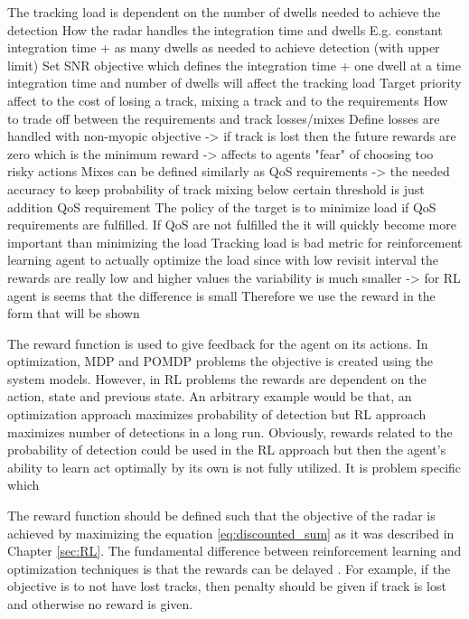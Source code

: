 \documentclass[english, 12pt, a4paper, elec, utf8, a-1b, online]{aaltothesis}
\begin{document}
\begin{outline}[itemize]
    \1 The tracking load is dependent on the number of dwells needed to achieve the detection
        \2 How the radar handles the integration time and dwells
            \3 E.g. constant integration time + as many dwells as needed to achieve detection (with upper limit)
            \3 Set SNR objective which defines the integration time + one dwell at a time
        \2 integration time and number of dwells will affect the tracking load
    \1 Target priority affect to the cost of losing a track, mixing a track and to the requirements
        \2 How to trade off between the requirements and track losses/mixes
            \3 Define losses are handled with non-myopic objective -> if track is lost then the future rewards are zero which is the minimum reward -> affects to agents "fear" of choosing too risky actions
            \3 Mixes can be defined similarly as QoS requirements -> the needed accuracy to keep probability of track mixing below certain threshold  is just addition QoS requirement
        \2 The policy of the target is to minimize load if QoS requirements are fulfilled. If QoS are not fulfilled the it will quickly become more important than minimizing the load
    \1 Tracking load is bad metric for reinforcement learning agent to actually optimize the load since with low revisit interval the rewards are really low and higher values the variability is much smaller -> for RL agent is seems that the difference is small
        \2 Therefore we use the reward in the form that will be shown 
\end{outline}

The reward function is used to give feedback for the agent on its actions.
In optimization, MDP and POMDP problems the objective is created using the system models.
However, in RL problems the rewards are dependent on the action, state and previous state. 
An arbitrary example would be that, an optimization approach maximizes probability of detection but RL approach maximizes number of detections in a long run.
Obviously, rewards related to the probability of detection could be used in the RL approach but then the agent's ability to learn act optimally by its own is not fully utilized.
It is problem specific which 

The reward function should be defined such that the objective of the radar is achieved by maximizing the equation \eqref{eq:discounted_sum} as it was described in Chapter \ref{sec:RL}.
The fundamental difference between reinforcement learning and optimization techniques is that the rewards can be delayed \cite{Sutton2018}.
For example, if the objective is to not have lost tracks, then penalty should be given if track is lost and otherwise no reward is given.
\end{document}
